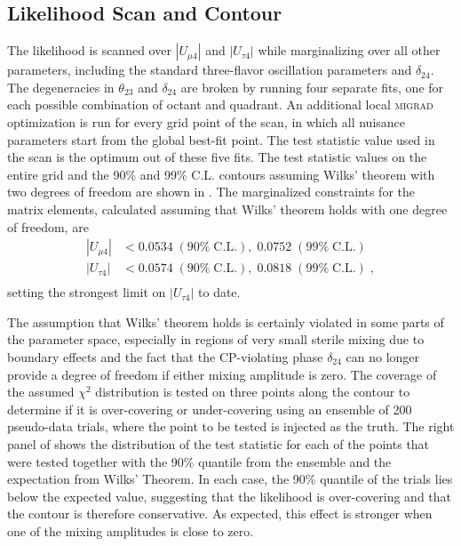 \subsection{Likelihood Scan and Contour}
The likelihood is scanned over $|U_{\mu 4}|$ and $|U_{\tau 4}|$ while marginalizing over all other parameters, including the standard three-flavor oscillation parameters and $\delta_{24}$.
The degeneracies in $\theta_{23}$ and $\delta_{24}$ are broken by running four separate fits, one for each possible combination of octant and quadrant.
An additional local \textsc{migrad} optimization is run for every grid point of the scan, in which all nuisance parameters start from the global best-fit point.
The test statistic value used in the scan is the optimum out of these five fits.
The test statistic values on the entire grid and the 90\% and 99\% C.L.
contours assuming Wilks' theorem with two degrees of freedom are shown in .
The marginalized constraints for the matrix elements, calculated assuming that Wilks' theorem holds with one degree of freedom, are
\begin{equation}
\begin{aligned}
    |U_{\mu 4}| & < 0.0534\;(90\%\;\mathrm{C.L.}),\;0.0752\;(99\%\;\mathrm{C.L.})\\
    |U_{\tau 4}| & < 0.0574\;(90\%\;\mathrm{C.L.}),\;0.0818\;(99\%\;\mathrm{C.L.})\;,\\
\end{aligned}
\end{equation}
setting the strongest limit on $|U_{\tau 4}|$ to date.

The assumption that Wilks' theorem holds is certainly violated in some parts of the parameter space, especially in regions of very small sterile mixing due to boundary effects and the fact that the CP-violating phase $\delta_{24}$ can no longer provide a degree of freedom if either mixing amplitude is zero.
The coverage of the assumed $\chi^2$ distribution is tested on three points along the contour to determine if it is over-covering or under-covering using an ensemble of 200 pseudo-data trials, where the point to be tested is injected as the truth.
The right panel of  shows the distribution of the test statistic for each of the points that were tested together with the 90\% quantile from the ensemble and the expectation from Wilks' Theorem.
In each case, the 90\% quantile of the trials lies below the expected value, suggesting that the likelihood is over-covering and that the contour is therefore conservative.
As expected, this effect is stronger when one of the mixing amplitudes is close to zero.

